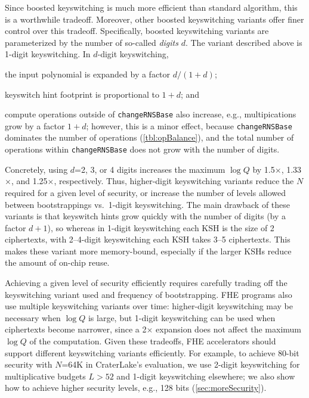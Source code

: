 Since boosted keyswitching is much more efficient than standard algorithm, this
is a worthwhile tradeoff. Moreover, other boosted keyswitching variants offer
finer control over this tradeoff. Specifically, boosted keyswitching variants
are parameterized by the number of so-called \emph{digits} $d$. The variant
described above is 1-digit keyswitching.
In $d$-digit keyswitching,
\begin{compactenum}
\item the input polynomial is expanded by a factor $d/(1+d)$;
\item keyswitch hint footprint is proportional to $1+d$; and
\item compute operations outside of \texttt{changeRNSBase} also increase, e.g.,
    multipications grow by a factor $1+d$; however, this is a minor effect,
    because \texttt{changeRNSBase} dominates the number of operations
    (\autoref{tbl:opBalance}), and the total number of operations within
    \texttt{changeRNSBase} does not grow with the number of digits.
\end{compactenum}

Concretely, using $d$=2, 3, or 4 digits increases the maximum $\log Q$ by
1.5$\times$, 1.33$\times$, and 1.25$\times$, respectively. Thus, higher-digit
keyswitching variants reduce the $N$ required for a given level of security, or
increase the number of levels allowed between bootstrappings vs.\ 1-digit
keyswitching. The main drawback of these variants is that keyswitch hints grow
quickly with the number of digits (by a factor $d+1$), so whereas in 1-digit
keyswitching each KSH is the size of 2 ciphertexts, with 2--4-digit
keyswitching each KSH takes 3--5 ciphertexts. This makes these variant more
memory-bound, especially if the larger KSHs reduce the amount of on-chip reuse.

Achieving a given level of security efficiently requires carefully trading off
the keyswitching variant used and frequency of bootstrapping. FHE programs also
use multiple keyswitching variants over time: higher-digit keyswitching may be
necessary when $\log Q$ is large, but 1-digit keyswitching can be used when
ciphertexts become narrower, since a 2$\times$ expansion does not affect the
maximum $\log Q$ of the computation. Given these tradeoffs, FHE accelerators
should support different keyswitching variants efficiently. For example, to
achieve 80-bit security with $N$=64K in CraterLake's evaluation, we use 2-digit
keyswitching for multiplicative budgets $L>52$ and 1-digit keyswitching
elsewhere; we also show how to achieve higher security levels, e.g., 128 bits
(\autoref{sec:moreSecurity}).

